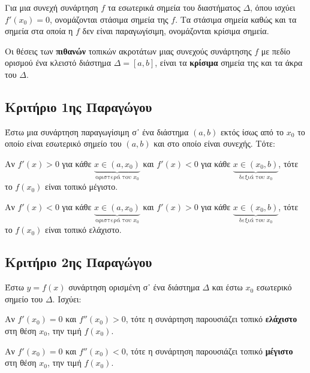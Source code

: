 \begin{dfn}
  Για μια συνεχή συνάρτηση $f$ τα εσωτερικά σημεία του διαστήματος $\Delta$, όπου 
  ισχύει $ f'(x_{0}) = 0 $, ονομάζονται \textcolor{Col1}{στάσιμα} σημεία της $f$. 
  Τα στάσιμα σημεία καθώς και τα σημεία στα οποία η $f$ δεν είναι παραγωγίσιμη,
  ονομάζονται \textcolor{Col1}{κρίσιμα} σημεία.
\end{dfn}

\begin{rem}
  Οι θέσεις των \textbf{πιθανών} τοπικών ακροτάτων μιας συνεχούς συνάρτησης $f$ με πεδίο 
  ορισμού ένα κλειστό διάστημα $ \Delta = [a,b] $, είναι τα \textbf{κρίσιμα} σημεία 
  της και τα άκρα του $\Delta$.
\end{rem}




\subsection*{Κριτήριο 1ης Παραγώγου}
Έστω μια συνάρτηση παραγωγίσιμη σ᾽ ένα διάστημα $ (a,b) $ εκτός ίσως από το $ x_{0} $ 
το οποίο είναι εσωτερικό σημείο του $(a,b)$ και στο οποίο είναι συνεχής. Τότε:
\begin{myitemize}
  \item Αν $ f'(x)>0 $ για κάθε 
    $ \underbrace{x \in (a, x_{0})}_{\text{αριστερά του } x_{0}} $ 
    και $ f'(x) <0 $ για κάθε
    $ \underbrace{x \in (x_{0}, b)}_{\text{δεξιά του } x_{0}} $, τότε το $ f(x_{0}) $ 
    είναι τοπικό μέγιστο. 
  \item Αν $ f'(x)<0 $ για κάθε 
    $ \underbrace{x \in (a, x_{0})}_{\text{αριστερά του } x_{0}} $ 
    και $ f'(x) >0 $ για κάθε
    $ \underbrace{x \in (x_{0}, b)}_{\text{δεξιά του } x_{0}} $, τότε το $ f(x_{0}) $ 
    είναι τοπικό ελάχιστο. 
\end{myitemize}



\subsection*{Κριτήριο 2ης Παραγώγου}

\begin{prop}
  Έστω $ y=f(x) $ συνάρτηση ορισμένη σ᾽ ένα διάστημα $\Delta$ και έστω $ x_{0} $ 
  εσωτερικό σημείο του $\Delta$. Ισχύει:
  \begin{myitemize}
    \item Αν $ f'(x_{0})=0 $ και $ f''(x_{0}) > 0 $, τότε η συνάρτηση παρουσιάζει τοπικό 
      \textbf{ελάχιστο} στη θέση $ x_{0} $, την τιμή $ f(x_{0}) $.
    \item Αν $ f'(x_{0})=0 $ και $ f''(x_{0}) < 0 $, τότε η συνάρτηση παρουσιάζει τοπικό 
      \textbf{μέγιστο} στη θέση $ x_{0} $, την τιμή $ f(x_{0}) $.
  \end{myitemize}
\end{prop}


